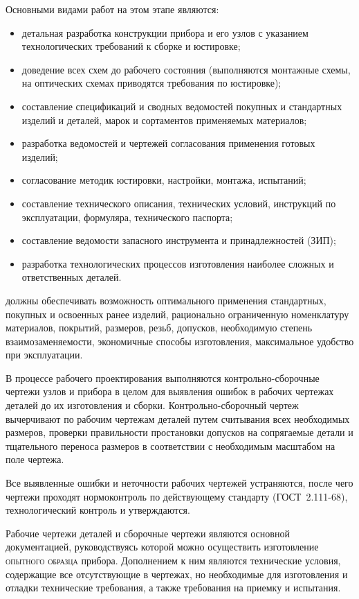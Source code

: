 Основными видами работ на этом этапе являются:
\begin{itemize}
	\item детальная разработка конструкции прибора и его узлов с указанием технологических требований к сборке и юстировке;
	\item доведение всех схем до рабочего состояния (выполняются монтажные схемы, на оптических схемах приводятся требования по юстировке);
	\item составление спецификаций и сводных ведомостей покупных и стандартных изделий и деталей, марок и сортаментов применяемых материалов;
	\item разработка ведомостей и чертежей согласования применения готовых изделий;
	\item согласование методик юстировки, настройки, монтажа, испытаний;
	\item составление технического описания, технических условий, инструкций по эксплуатации, формуляра, технического паспорта;
	\item составление ведомости запасного инструмента и принадлежностей (ЗИП);
	\item разработка технологических процессов изготовления наиболее сложных и ответственных деталей.
\end{itemize}

 должны обеспечивать возможность оптимального применения стандартных, покупных и освоенных ранее изделий, рационально ограниченную номенклатуру материалов, покрытий, размеров, резьб, допусков, необходимую степень взаимозаменяемости, экономичные способы изготовления, максимальное удобство при эксплуатации.

В процессе рабочего проектирования выполняются контрольно-сборочные чертежи узлов и прибора в целом для выявления ошибок в рабочих чертежах деталей до их изготовления и сборки. Контрольно-сборочный чертеж вычерчивают по рабочим чертежам деталей путем считывания всех необходимых размеров, проверки правильности простановки допусков на сопрягаемые детали и тщательного переноса размеров в соответствии с необходимым масштабом на поле чертежа.

Все выявленные ошибки и неточности рабочих чертежей устраняются, после чего чертежи проходят нормоконтроль по действующему стандарту (ГОСТ~2.111-68), технологический контроль и утверждаются.

Рабочие чертежи деталей и сборочные чертежи являются основной документацией, руководствуясь которой можно осуществить изготовление \textsc{опытного образца} прибора. Дополнением к ним являются технические условия, содержащие все отсутствующие в чертежах, но необходимые для изготовления и отладки технические требования, а также требования на приемку и испытания.

